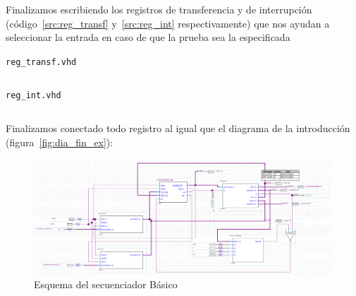 \documentclass[table]{scrartcl}
\newenvironment{code}{\captionsetup{type=listing}}{}
\begin{document}
Finalizamos escribiendo los registros de transferencia y de interrupción
(código~\ref{src:reg_transf} y~\ref{src:reg_int} respectivamente) que nos
ayudan a seleccionar la entrada en caso de que la prueba sea la especificada
\begin{code}
  \caption{\texttt{reg_transf.vhd}}\label{src:reg_transf}
  \inputminted{vhdl}{./reg_transf.vhd}
\end{code}
\begin{code}
  \caption{\texttt{reg_int.vhd}}\label{src:reg_int}
  \inputminted{vhdl}{./reg_int.vhd}
\end{code}

Finalizamos conectado todo registro al igual que el diagrama de la introducción (figura~\ref{fig:dia_fin_ex}):
\begin{figure}[H]
  \centering
  \includegraphics[width=\textwidth]{./img/fin_dia}
  \caption{Esquema del secuenciador Básico}\label{fig:fin_dia}
\end{figure}
\newpage{}
\end{document}
